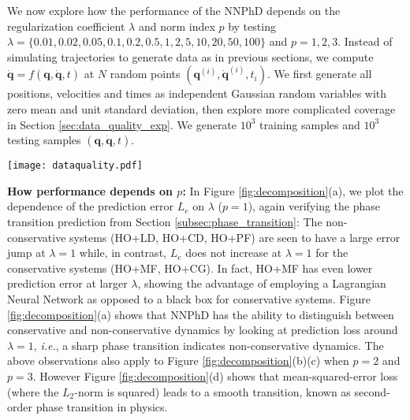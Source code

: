 \documentclass[aps,pre,reprint,superscriptaddress,nofootinbib,amsmath,amssymb]{revtex4-2}
\def\ie{{\frenchspacing\it i.e.}}
\newcommand{\mat}[1]{\mathbf{#1}}
\newcommand{\q}{\mat{q}}
\newcommand{\qd}{\dot{\mat{q}}}
\begin{document}
We now explore how the performance of the NNPhD depends on the regularization coefficient $\lambda$ and norm index $p$ by testing $\lambda=\{0.01,0.02,0.05,0.1,0.2,0.5,1,2,5,10,20,50,100\}$ and $p=1,2,3$. %
Instead of simulating trajectories to generate data as in previous sections, we compute $\qd=f(\q,\qd,t)$ at $N$ random points $(\q^{(i)},\qd^{(i)},t_i)$. We first generate all positions, velocities and times as independent Gaussian random variables with zero mean and unit standard deviation, then explore more complicated coverage in Section \ref{sec:data_quality_exp}. We generate $10^3$ training samples and $10^3$ testing samples $(\q,\qd,t)$. 
\begin{figure*}[htbp]
	\centering
	\texttt{[image: dataquality.pdf]}
	\caption{Dependence on data distribution parameters $\alpha$ and $\beta$. Low quality data might prevent new physics discovery via (a) incomplete data coverage and (b) biased data distribution.}
	\label{fig:dataquality}
\end{figure*}

{\bf How performance depends on $p$:} In Figure \ref{fig:decomposition}(a), we plot the dependence of the prediction error $L_e$ on $\lambda$ ($p=1$), again verifying the phase transition prediction from Section \ref{subsec:phase_transition}: The non-conservative systems (HO+LD, HO+CD, HO+PF) are seen to have a large error jump at $\lambda=1$ while, in contrast, {$L_e$ does not increase} at $\lambda=1$ for the conservative systems (HO+MF, HO+CG). In fact, HO+MF has even lower prediction error at larger $\lambda$, showing the advantage of employing a Lagrangian Neural Network as opposed to a black box for conservative systems. Figure \ref{fig:decomposition}(a) shows that NNPhD has the ability to distinguish between conservative and non-conservative dynamics by looking at prediction loss around $\lambda=1$, \ie, a sharp phase transition indicates non-conservative dynamics. The above observations also apply to Figure \ref{fig:decomposition}(b)(c) when $p=2$ and $p=3$. However Figure \ref{fig:decomposition}(d) shows that mean-squared-error loss (where the $L_2$-norm is squared) leads to a smooth transition, known as second-order phase transition in physics.
\end{document}

